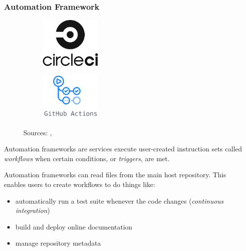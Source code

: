 \begin{frame}[t]
    \frametitle{Automation Framework}
    \begin{figure}[htpb]
        \begin{subfigure}
            \centering
            \includegraphics[width=3cm]{images/circleci-logo.png}
        \end{subfigure}
        \hspace{1cm}
        \begin{subfigure}
            \centering
            \includegraphics[width=3cm]{images/github-actions-logo.png}
        \end{subfigure}
        \newline
        {\tiny Sources: \cite{circle_ci_logo}, \cite{github_actions_logo}}
    \end{figure}

    Automation frameworks are services execute user-created instruction sets called {\it workflows} when certain conditions, or {\it triggers}, are met.

    Automation frameworks can read files from the main host repository. This enables users to create workflows to do things like:
    \begin{itemize}
        \item automatically run a test suite whenever the code changes ({\it continuous integration})
        \item build and deploy online documentation
        \item manage repository metadata
    \end{itemize}
    
\end{frame}

